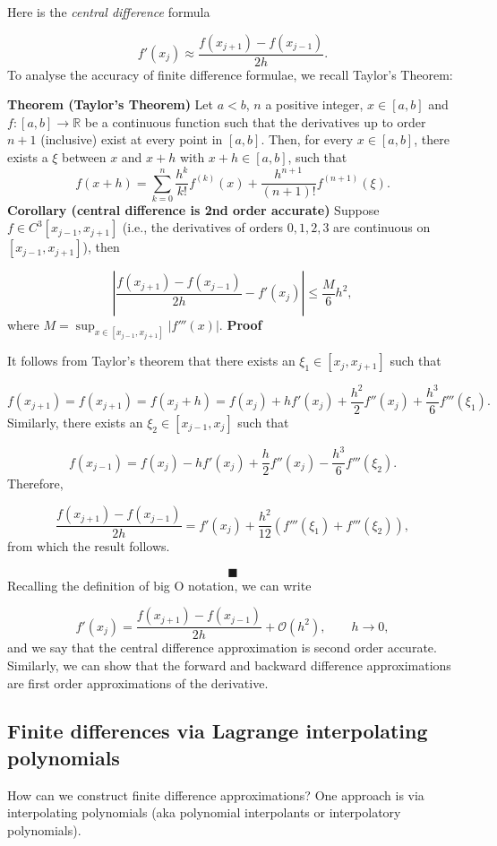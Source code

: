 \documentclass[12pt,landscape]{article}
\begin{document}
{Here is the \emph{central difference} formula

\[
f'(x_j) \approx \frac{f(x_{j+1})-f(x_{j-1})}{2h}.
\]
To analyse the accuracy of finite difference formulae, we recall Taylor's Theorem:

\textbf{Theorem (Taylor's Theorem)}  Let $a<b$, $n$ a positive integer, $x\in[a,b]$ and $f: [a,b]\to\mathbb{R}$ be a continuous function such that the derivatives up to order $n+1$ (inclusive) exist at every point in $[a,b]$. Then, for every $x\in[a,b]$, there exists a $\xi$ between $x$ and $x+h$ with $x+h\in[a,b]$, such that
\[
f(x+h)=\sum_{k=0}^{n}\frac{h^k}{k!}f^{(k)}(x)+\frac{h^{n+1}}{(n+1)!}f^{(n+1)}(\xi).
\]
\textbf{Corollary (central difference is 2nd order accurate)} Suppose $f \in C^3[x_{j-1},x_{j+1}]$ (i.e., the derivatives of orders $0, 1, 2, 3$ are continuous on $[x_{j-1},x_{j+1}]$), then 

\[
\left\vert\frac{f(x_{j+1})-f(x_{j-1})}{2h} - f'(x_j) \right\vert \leq \frac{M}{6}h^2, 
\]
where $M = \sup_{x \in [x_{j-1}, x_{j+1}]} \vert f'''(x) \vert$.
\newpage
\textbf{Proof}

It follows from Taylor's theorem that there exists an $\xi_1 \in [x_{j}, x_{j+1}]$ such that 

\[
f(x_{j+ 1}) = f(x_{j + 1}) = f(x_j + h) = f(x_j) + h f'(x_j) + \frac{h^2}{2}f''(x_j) + \frac{h^3}{6}f'''(\xi_1).
\]
Similarly, there exists an $\xi_2 \in [x_{j-1}, x_{j}]$ such that 

\[
f(x_{j- 1}) = f(x_j) - h f'(x_j) + \frac{h}{2}f''(x_j) - \frac{h^3}{6}f'''(\xi_2).
\]
Therefore,

\[
\frac{f(x_{j+1})-f(x_{j-1})}{2h} = f'(x_j) + \frac{h^2}{12}\left( f'''(\xi_1) + f'''(\xi_2)   \right),
\]
from which the result follows.

\[
\blacksquare
\]
\newpage
Recalling the definition of big O notation, we can write

\[
f'(x_j) = \frac{f(x_{j+1})-f(x_{j-1})}{2h} + \mathcal{O}(h^2), \qquad h \to 0,
\]
and we say that the central difference approximation is second order accurate.  Similarly, we can show that the forward and backward difference approximations are first order approximations of the derivative.

\subsection{Finite differences via Lagrange interpolating polynomials}
How can we construct finite difference approximations?  One approach is via interpolating polynomials (aka polynomial interpolants or interpolatory polynomials).

}
\end{document}
